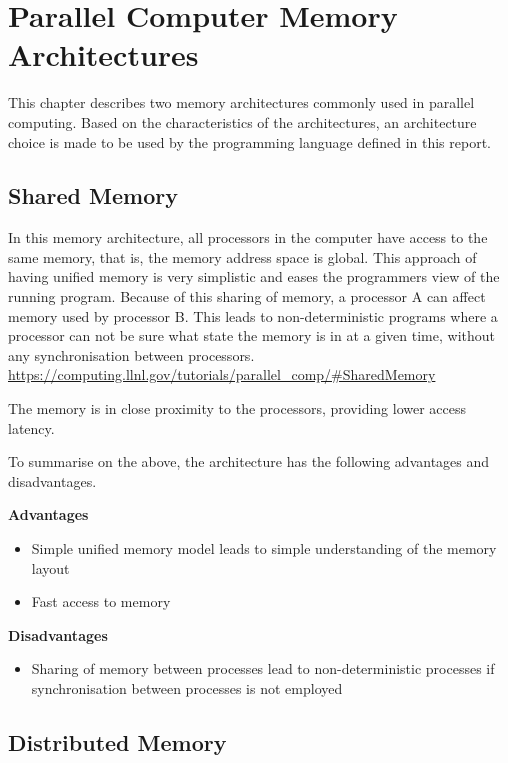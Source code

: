 \chapter{Parallel Computer Memory Architectures}

This chapter describes two memory architectures commonly used in parallel computing. Based on the characteristics of the architectures, an architecture choice is made to be used by the programming language defined in this report.

\section{Shared Memory}

In this memory architecture, all processors in the computer have access to the same memory, that is, the memory address space is global. This approach of having unified memory is very simplistic and eases the programmers view of the running program.
Because of this sharing of memory, a processor A can affect memory used by processor B. This leads to non-deterministic programs where a processor can not be sure what state the memory is in at a given time, without any synchronisation between processors. \url{https://computing.llnl.gov/tutorials/parallel_comp/#SharedMemory}

The memory is in close proximity to the processors, providing lower access latency. %

To summarise on the above, the architecture has the following advantages and disadvantages. 

\noindent\textbf{Advantages}
\begin{itemize}
    \item Simple unified memory model leads to simple understanding of the memory layout
    \item Fast access to memory
\end{itemize}

\noindent\textbf{Disadvantages}
\begin{itemize}
    \item Sharing of memory between processes lead to non-deterministic processes if synchronisation between processes is not employed
\end{itemize}

\section{Distributed Memory}

